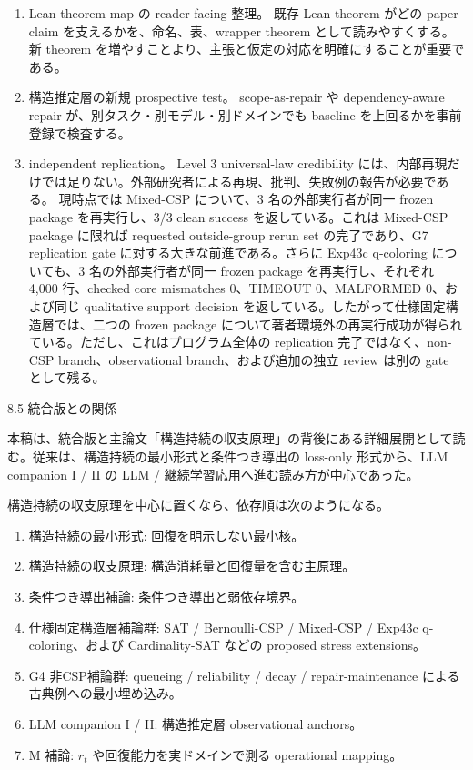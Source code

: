 \documentclass[12pt,a4paper]{article}
\begin{document}
\begin{enumerate}
\def\labelenumi{\arabic{enumi}.}
\setcounter{enumi}{2}
\item
  Lean theorem map の reader-facing 整理。 既存 Lean theorem がどの paper claim を支えるかを、命名、表、wrapper theorem として読みやすくする。新 theorem を増やすことより、主張と仮定の対応を明確にすることが重要である。
\item
  構造推定層の新規 prospective test。 scope-as-repair や dependency-aware repair が、別タスク・別モデル・別ドメインでも baseline を上回るかを事前登録で検査する。
\item
  independent replication。 Level 3 universal-law credibility には、内部再現だけでは足りない。外部研究者による再現、批判、失敗例の報告が必要である。 現時点では Mixed-CSP について、3 名の外部実行者が同一 frozen package を再実行し、3/3 clean success を返している。これは Mixed-CSP package に限れば requested outside-group rerun set の完了であり、G7 replication gate に対する大きな前進である。さらに Exp43c q-coloring についても、3 名の外部実行者が同一 frozen package を再実行し、それぞれ 4,000 行、checked core mismatches 0、TIMEOUT 0、MALFORMED 0、および同じ qualitative support decision を返している。したがって仕様固定構造層では、二つの frozen package について著者環境外の再実行成功が得られている。ただし、これはプログラム全体の replication 完了ではなく、non-CSP branch、observational branch、および追加の独立 review は別の gate として残る。
\end{enumerate}

8.5 統合版との関係

本稿は、統合版と主論文「構造持続の収支原理」の背後にある詳細展開として読む。従来は、構造持続の最小形式と条件つき導出の loss-only 形式から、LLM companion I / II の LLM / 継続学習応用へ進む読み方が中心であった。

構造持続の収支原理を中心に置くなら、依存順は次のようになる。

\begin{enumerate}
\def\labelenumi{\arabic{enumi}.}
\tightlist
\item
  構造持続の最小形式: 回復を明示しない最小核。
\item
  構造持続の収支原理: 構造消耗量と回復量を含む主原理。
\item
  条件つき導出補論: 条件つき導出と弱依存境界。
\item
  仕様固定構造層補論群: SAT / Bernoulli-CSP / Mixed-CSP / Exp43c q-coloring、および Cardinality-SAT などの proposed stress extensions。
\item
  G4 非CSP補論群: queueing / reliability / decay / repair-maintenance による古典例への最小埋め込み。
\item
  LLM companion I / II: 構造推定層 observational anchors。
\item
  M 補論: \(r_{t}\) や回復能力を実ドメインで測る operational mapping。
\end{enumerate}
\end{document}
